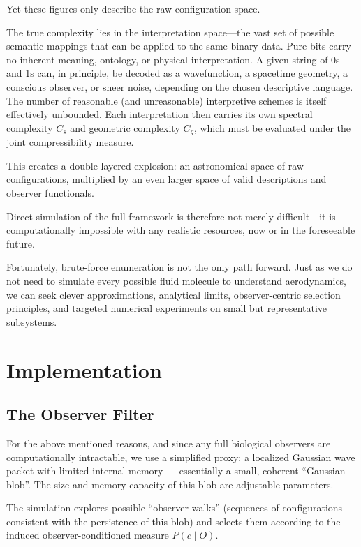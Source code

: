 Yet these figures only describe the raw configuration space.

The true complexity lies in the interpretation space—the vast set of possible semantic mappings that can be applied to the same binary data.
Pure bits carry no inherent meaning, ontology, or physical interpretation.
A given string of 0s and 1s can, in principle, be decoded as a wavefunction, a spacetime geometry, a conscious observer, or sheer noise, depending on the chosen descriptive language.
The number of reasonable (and unreasonable) interpretive schemes is itself effectively unbounded.
Each interpretation then carries its own spectral complexity \(C_s\) and geometric complexity \(C_g\), which must be evaluated under the joint compressibility measure.

This creates a double-layered explosion: an astronomical space of raw configurations, multiplied by an even larger space of valid descriptions and observer functionals.

Direct simulation of the full framework is therefore not merely difficult—it is computationally impossible with any realistic resources, now or in the foreseeable future.

Fortunately, brute-force enumeration is not the only path forward.
Just as we do not need to simulate every possible fluid molecule to understand aerodynamics, we can seek clever approximations, analytical limits, observer-centric selection principles, and targeted numerical experiments on small but representative subsystems.


\section{Implementation}

\subsection*{The Observer Filter}

For the above mentioned reasons, and since any full biological observers are computationally intractable, we use a simplified proxy: a localized Gaussian wave packet with limited internal memory — essentially a small, coherent ``Gaussian blob''.
The size and memory capacity of this blob are adjustable parameters.

The simulation explores possible ``observer walks'' (sequences of configurations consistent with the persistence of this blob) and selects them according to the induced observer-conditioned measure $P(c \mid O)$.

